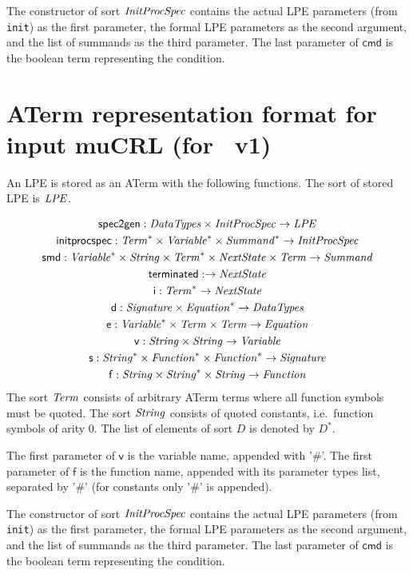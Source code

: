 \documentclass[fleqn,a4paper,dvips]{article}
\newcommand{\aterm}[1]{\mathsf{#1}}
\newcommand{\afunc}[3]{\aterm{#1}:#2\rightarrow#3}
\begin{document}
The constructor of sort $\mathit{InitProcSpec}$ contains the actual LPE
parameters (from \texttt{init}) as the first parameter, the formal LPE
parameters as the second argument, and the list of summands as the
third parameter. The last parameter of $\mathsf{cmd}$ is the boolean term
representing the condition.

\newpage
\section{ATerm representation format for input muCRL (for \mcrl\ v1)}
An LPE is stored as an ATerm with the following functions. The sort
of stored LPE is $\mathit{LPE}$.

\begin{gather*}
\afunc{spec2gen}{\nm{DataTypes}\x\nm{InitProcSpec}}{\nm{LPE}}\\
\afunc{initprocspec}{\nm{Term}^*\x\nm{Variable}^*\x\nm{Summand}^*}{\nm{InitProcSpec}}\\
\afunc{smd}{\nm{Variable}^*\x\nm{String}\x\nm{Term}^*\x\nm{NextState}\x\nm{Term}}{\nm{Summand}}\\
\afunc{terminated}{}{\nm{NextState}}\\
\afunc{i}{\nm{Term}^*}{\nm{NextState}}\\
\afunc{d}{\nm{Signature}\x\nm{Equation}^*}{\nm{DataTypes}}\\
\afunc{e}{\nm{Variable}^*\x\nm{Term}\x\nm{Term}}{\nm{Equation}}\\
\afunc{v}{\nm{String}\x\nm{String}}{\nm{Variable}}\\
\afunc{s}{\nm{String}^*\x\nm{Function}^*\x\nm{Function}^*}{\nm{Signature}}\\
\afunc{f}{\nm{String}\x\nm{String}^{*}\x\nm{String}}{\nm{Function}}
\end{gather*}
The sort $\mathit{Term}$ consists of arbitrary ATerm terms where all function
symbols must be quoted. The sort $\mathit{String}$ consists of quoted constants,
i.e.\ function symbols of arity 0. The list
of elements of sort $D$ is denoted by $D^{*}$.

The first parameter of $\mathsf{v}$ is the variable name, appended with '\#'.
The first parameter of $\mathsf{f}$ is the function name, appended 
with its parameter types list, separated by '\#' (for constants only '\#' is appended).

The constructor of sort $\mathit{InitProcSpec}$ contains the actual LPE
parameters (from \texttt{init}) as the first parameter, the formal LPE
parameters as the second argument, and the list of summands as the
third parameter. The last parameter of $\mathsf{cmd}$ is the boolean term
representing the condition.

%
%
\end{document}
